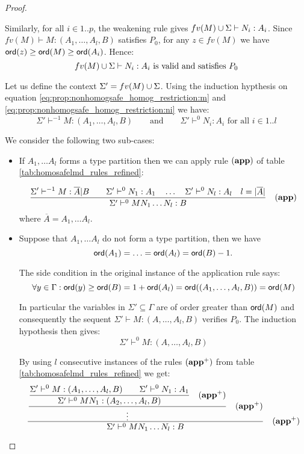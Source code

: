 \begin{proof}
\begin{itemize}
Similarly, for all $i \in 1..p$, the weakening rule gives $fv(M) \cup \Sigma \vdash N_i : A_i$.
Since $fv(M) \vdash M : (A_1,\ldots,A_l,B)$ satisfies $P_0$,
for any $z \in fv(M)$ we have ${\sf ord}(z) \geq {\sf ord}(M) \geq {\sf ord}(A_i)$. Hence:
\begin{equation}
fv(M) \cup \Sigma \vdash N_i : A_i \mbox{ is valid and satisfies } P_0 \label{eq:prop:nonhomogsafe_homog_restriction:ni}
\end{equation}

Let us define the context $\Sigma' = fv(M) \cup \Sigma$. Using the induction hypthesis on equation
\ref{eq:prop:nonhomogsafe_homog_restriction:m} and \ref{eq:prop:nonhomogsafe_homog_restriction:ni} we have:
$$
\Sigma' \vdash^{-1} M : (A_1,\ldots,A_l,B) \qquad \mbox{and} \qquad \Sigma' \vdash^0 N_i : A_i \mbox{ for all } i \in 1..l
$$


We consider the following two sub-cases:
\begin{itemize}
\item If $A_1, \ldots A_l$ forms a type partition then we can apply
rule $\mathbf{(app)}$ of table \ref{tab:homosafelmd_rules_refined}:

$$ \frac{\displaystyle \Sigma' \vdash^{-1} M : \overline{A} | B
                                        \qquad \Sigma' \vdash^{0} N_1 :
                                        A_1
                                        \quad \ldots \quad \Sigma' \vdash^{0} N_l :
                                        A_l
                                        \quad l = |\overline{A}|
                                        }{\Sigma'  \vdash^{0} M N_1 \ldots N_l : B} \quad  \mathbf{(app)}
$$
where $\overline{A} = A_1, \ldots A_l$.

\item  Suppose that $A_1, \ldots A_l$ do not form a type partition, then we
have $${\sf ord}(A_1) = \ldots = {\sf ord}(A_l) = {\sf ord}(B) - 1.$$

The side condition in the original instance of the application rule says:
$$\forall y \in \Gamma : {\sf ord}(y) \geq {\sf ord}(B) = 1 + {\sf ord}(A_l) = {\sf ord}((A_1,\ldots, A_l,B)) = {\sf ord}(M)$$

In particular the variables in $\Sigma' \subseteq \Gamma$ are of order greater than ${\sf ord}(M)$ and consequently
the sequent $\Sigma' \vdash M : (A,\ldots,A_l,B)$ verifies $P_0$. The induction hypothesis then gives:
$$\Sigma' \vdash^0 M : (A,\ldots,A_l,B)$$

By using $l$ consecutive instances of the rules $\mathbf{(app^+)}$ from table \ref{tab:homosafelmd_rules_refined} we get:
$$  \frac{\displaystyle  \frac{\displaystyle  \frac{\displaystyle  \Sigma' \vdash^0 M : (A_1,\ldots, A_l,B)
                    \qquad \Sigma'\vdash^{0} N_1 : A_1
                    }{ \Sigma' \vdash^0 M N_1 : (A_2,\ldots, A_l,B)} \quad \mathbf{(app^+)}
          }{ \vdots
          }
          \quad \mathbf{(app^+)}
       }{ \Sigma'  \vdash^{0} M N_1 \ldots N_l : B } \quad \mathbf{(app^+)}
$$
\end{itemize}


\end{itemize}
\end{proof}

